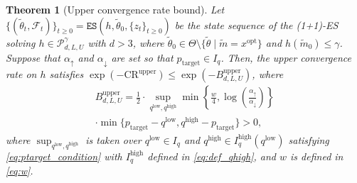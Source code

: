 \documentclass[journal]{IEEEtran}
\renewcommand{\geq}{\geqslant} %
\renewcommand{\leq}{\leqslant} %
\newtheorem{theorem}{Theorem}[]
\theoremstyle{definition}
\newcommand{\yohe}[1]{{\color{cyan}Y.A.: #1}}
\newcommand{\mori}[1]{{\color[rgb]{0.22, 0.71, 0.55} MORINAGA :  #1}}
\newcommand{\aup}{\alpha_{\uparrow}}
\newcommand{\adown}{\alpha_{\downarrow}}
\begin{document}
\begin{theorem}[Upper convergence rate bound]\label{theorem:lower}
Let $\{(\tilde{\theta}_t, \mathcal{F}_t)\}_{t \geq 0} = \texttt{ES}(h, \tilde{\theta}_0, \{z_t\}_{t \geq 0})$ be the state sequence of the (1+1)-ES solving $h\in\mathcal{P}_{d, L, U}^\gamma$ with $d > 3$, where $\tilde{\theta}_0 \in \Theta\setminus\{\tilde{\theta}\mid \tilde{m}= x^\mathrm{opt}\}$ and $h(\tilde{m}_0) \leq \gamma$.
Suppose that $\aup$ and $\adown$ are set so that $p_\mathrm{target} \in I_q$.
%
Then, the upper convergence rate on $h$ satisfies $\exp(-\mathrm{CR}^\mathrm{upper}) \leq \exp(-B_{d, L, U}^\mathrm{upper})$, where
\begin{multline}
B_{d, L, U}^\mathrm{upper}
= \frac12\cdot\sup_{q^\mathrm{low}, q^\mathrm{high}}
\min\left\{\frac{w}{4}, \log\left(\frac{\aup}{\adown}\right)\right\}
\\
\cdot \min\{p_\mathrm{target} -  q^\mathrm{low}, q^\mathrm{high} - p_\mathrm{target} \} > 0 ,
\label{eq:B}
\end{multline}
where $\sup_{q^\mathrm{low}, q^\mathrm{high}}$ is taken over $q^\mathrm{low}\in I_q$ and $q^\mathrm{high}\in I_q^\mathrm{high}(q^\mathrm{low})$ satisfying \eqref{eq:ptarget_condition} with 
$I_q^\mathrm{high}$ defined in \eqref{eq:def_qhigh}, and $w$ is defined in \eqref{eq:w}.
% 

\end{theorem}
\end{document}
